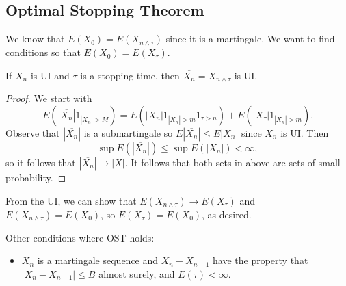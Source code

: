 \documentclass[11pt]{scrartcl}
\begin{document}
\subsection{Optimal Stopping Theorem}
We know that $E(X_0) = E(X_{n \wedge \tau})$ since it is a martingale.  We want to find conditions so that $E(X_0) = E(X_\tau)$.
\begin{lemma} If $X_n$ is UI and $\tau$ is a stopping time, then $\overline{X_n} = X_{n \wedge \tau}$ is UI.
\end{lemma}
\begin{proof}
We start with 
$$E(|\overline{X_n}|1_{|\overline{X_n}| > M}) = E(|X_n|1_{|\overline{X_n}| > m}1_{\tau > n}) + E(|X_\tau|1_{|\overline{X_n}| > m}).$$
Observe that $|\overline{X_{n}}|$ is a submartingale so $E|\overline{X_n}| \le E|X_n|$ since $X_n$ is UI.  Then 
$$\sup E(|\overline{X_n}|) \le \sup E(|X_n|) < \infty,$$
so it follows that $|\overline{X_n}| \to |X|$.  It follows that both sets in above are sets of small probability.
\end{proof}

From the UI, we can show that $E(X_{n \wedge \tau}) \to E(X_\tau)$ and $E(X_{n \wedge \tau}) = E(X_0)$, so $E(X_\tau) = E(X_0)$, as desired.

Other conditions where OST holds:
\begin{itemize}
\item $X_n$ is a martingale sequence and $X_n - X_{n-1}$ have the property that $|X_n - X_{n-1}| \le B$ almost surely, and $E(\tau) < \infty$.  
\end{itemize}
\end{document}
